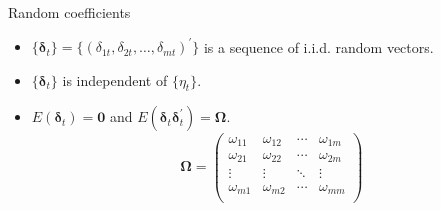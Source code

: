 \documentclass[presentation,10pt]{beamer}
\begin{document}
\begin{frame}[label={sec:orgbb8d9d2}]{Random coefficients}
\begin{itemize}
\item \(\{\boldsymbol{\delta}_t\} = \{(\delta_{1t}, \delta_{2t}, \ldots,
  \delta_{mt})^{\prime}\}\) is a sequence of i.i.d. random vectors.
\end{itemize}

\vspace{0.1cm}

\begin{itemize}
\item \(\{\boldsymbol{\delta}_t\}\) is independent of \(\{\eta_t\}\).
\end{itemize}

\vspace{0.1cm}

\begin{itemize}
\item \(E(\boldsymbol{\delta}_t) = \mathbf{0}\) and \(E(\boldsymbol{\delta}_t
  \boldsymbol{\delta}_t^{\prime}) = \boldsymbol{\Omega}\).
\begin{equation*}
\boldsymbol{\Omega} = 
\begin{pmatrix}
\omega_{11} & \omega_{12} & \cdots & \omega_{1m} \\
\omega_{21} & \omega_{22} & \cdots & \omega_{2m} \\
\vdots      & \vdots      & \ddots & \vdots \\
\omega_{m1} & \omega_{m2} & \cdots & \omega_{mm} \\
  \end{pmatrix}
\end{equation*}
\end{itemize}
\end{frame}
\end{document}
